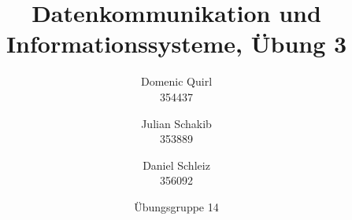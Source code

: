\documentclass{../exercisesheet}
\title{Datenkommunikation und Informationssysteme, Übung 3}
\author{
    Domenic Quirl \\ 354437
    \and
    Julian Schakib \\ 353889
    \and 
    Daniel Schleiz \\ 356092
}
\date{Übungsgruppe 14}
\begin{document}
\maketitle
\pointtable

\begin{exercise}{1.5}
	\begin{subexercise}
	
	\end{subexercise}
	
	\begin{subexercise}
	
	\end{subexercise}
\end{exercise}

\begin{exercise}{3}
	\begin{subexercise}
	
	\end{subexercise}

	\begin{subexercise}
	
	\end{subexercise}
\end{exercise}


\begin{exercise}{3}
	\begin{subexercise}
	
	\end{subexercise}

	\begin{subexercise}
	
	\end{subexercise}

	\begin{subexercise} 
		
	\end{subexercise}
\end{exercise}

\begin{exercise}{1}
	
\end{exercise}

\begin{exercise}{2.5}
	\begin{subexercise}
		
	\end{subexercise}

	\begin{subexercise}
	
	\end{subexercise}
\end{exercise}

\begin{exercise}{4}
	\begin{subexercise}
	
	\end{subexercise}

	\begin{subexercise}
	
	\end{subexercise}

	\begin{subexercise} 
		
	\end{subexercise}
\end{exercise}
\end{document}
